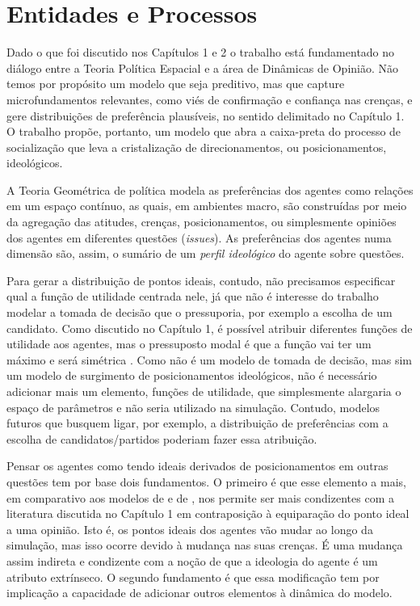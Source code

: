 \section{Entidades e Processos}

Dado o que foi discutido nos Capítulos 1 e 2 o trabalho está fundamentado no
diálogo entre a Teoria Política Espacial e a área de Dinâmicas de Opinião. Não
temos por propósito um modelo que seja preditivo, mas que capture
microfundamentos relevantes, como viés de confirmação e confiança nas crenças, e
gere distribuições de preferência plausíveis, no sentido delimitado no Capítulo
1. O trabalho propõe, portanto, um modelo que abra a caixa-preta do processo de
socialização que leva a cristalização de direcionamentos, ou posicionamentos,
ideológicos.

A Teoria Geométrica de política modela as preferências dos agentes como relações
em um espaço contínuo, as quais, em ambientes macro, são construídas por meio da
agregação das atitudes, crenças, posicionamentos, ou simplesmente opiniões dos
agentes em diferentes questões (\textit{issues}). As preferências dos agentes
numa dimensão são, assim, o sumário de um \textit{perfil ideológico} do agente
sobre questões.

Para gerar a distribuição de pontos ideais, contudo, não precisamos especificar
qual a função de utilidade centrada nele, já que não é interesse do trabalho
modelar a tomada de decisão que o pressuporia, por exemplo a escolha de um
candidato. Como discutido no Capítulo 1, é possível atribuir diferentes funções
de utilidade aos agentes, mas o pressuposto modal é que a função vai ter um
máximo e será simétrica \cite{eguia2013spatial, carroll2013structure}. Como não
é um modelo de tomada de decisão, mas sim um modelo de surgimento de
posicionamentos ideológicos, não é necessário adicionar mais um elemento,
funções de utilidade, que simplesmente alargaria o espaço de parâmetros e não
seria utilizado na simulação. Contudo, modelos futuros que busquem ligar, por
exemplo, a distribuição de preferências com a escolha de candidatos/partidos
poderiam fazer essa atribuição.


Pensar os agentes como tendo ideais derivados de posicionamentos em outras
questões tem por base dois fundamentos. O primeiro é que esse elemento a mais, em
comparativo aos modelos de  e de
, nos permite ser mais condizentes com a
literatura discutida no Capítulo 1 em contraposição à equiparação do ponto ideal
a uma opinião. Isto é, os pontos ideais dos agentes vão mudar ao longo da
simulação, mas isso ocorre devido à mudança nas suas crenças. É uma
mudança assim indireta e condizente com a noção de que a ideologia do agente é
um atributo extrínseco. O segundo fundamento é que essa modificação tem por
implicação a capacidade de adicionar outros elementos à dinâmica do modelo.

